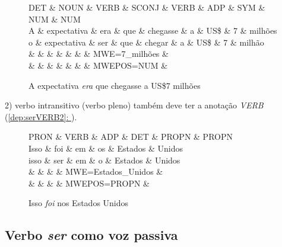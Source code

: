 \documentclass[output=paper,colorlinks,citecolor=brown]{langscibook}
\newcommand*{\fullref}[1]{\hyperref[{#1}]{\autoref*{#1}: \nameref*{#1}}} %
\begin{document}
\begin{figure}[htbp]
    \centering
    \vspace{.8cm}
    \begin{dependency}
    \begin{deptext}
    DET \& NOUN \& VERB \& SCONJ \& VERB \& ADP \& SYM \& NUM \& NUM \\
    A \& expectativa \& era \& que \& chegasse \& a \& US\$ \& 7 \& milhões \\
    o \& expectativa \& ser \& que \& chegar \& a \& US\$ \& 7 \& milhão \\
    \& \& \& \& \& \& \& MWE=7\_milhões \& \\
    \& \& \& \& \& \& \& MWEPOS=NUM \& \\
    \end{deptext}
    \end{dependency}
    \caption{A expectativa \emph{era} que chegasse a US\$7 milhões}\label{dep:serVERB}
\end{figure}

2)  verbo intransitivo (verbo pleno) também deve ter a anotação \textit{VERB} (\fullref{dep:serVERB2}).

\begin{figure}[htbp]
    \centering
    \vspace{.8cm}
    \begin{dependency}
    \begin{deptext}
    PRON \& VERB \& ADP \& DET \& PROPN \& PROPN \\
    Isso \& foi \& em \& os \& Estados \& Unidos \\
    isso \& ser \& em \& o \& Estados \& Unidos \\
    \& \& \& \& MWE=Estados\_Unidos \& \\
    \& \& \& \& MWEPOS=PROPN \& \\
    \end{deptext}
    \end{dependency}
    \caption{Isso \emph{foi} nos Estados Unidos}\label{dep:serVERB2}
\end{figure}


\subsection{Verbo \textit{ser} como voz passiva}\label{sec:serpassiva}
\end{document}
